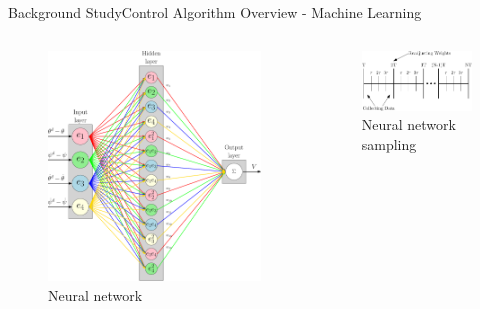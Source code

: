 \documentclass{beamer}
\begin{document}
\begin{frame}{Background Study}{Control Algorithm Overview - Machine Learning}
    \begin{columns}
    \begin{figure}
        \centering
        \includegraphics[width=\textwidth]{figs/ipe/ADP_Neural_Network}
        \caption{Neural network}
        \label{fig:ADP_Neural_Networkl}
    \end{figure}
    \begin{figure}
      \centering 
      \includegraphics[width=\textwidth]{figs/ipe/ADP_Samples}
      \caption{Neural network sampling}
      \label{fig:ADP_Samples}
    \end{figure}    
    \end{columns}
\end{frame}
\end{document}
